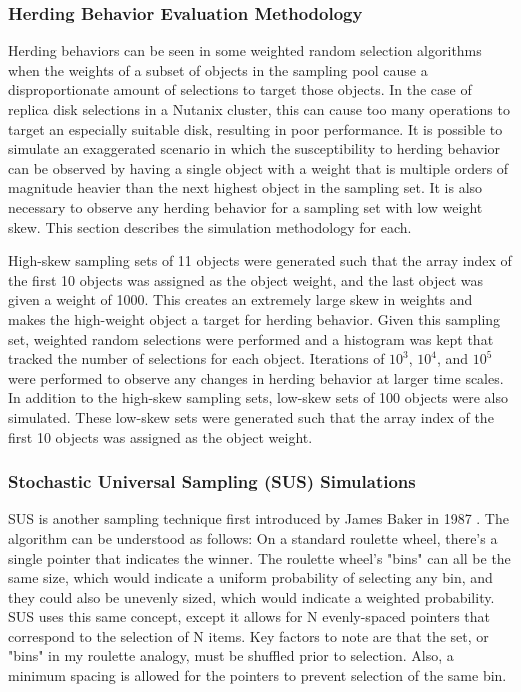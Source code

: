 \documentclass[12pt]{article}
\begin{document}
    \subsubsection{Herding Behavior Evaluation Methodology}
    Herding behaviors can be seen in some weighted random selection
    algorithms when the weights of a subset of objects in the sampling pool
    cause a disproportionate amount of selections to target those objects. In
    the case of replica disk selections in a Nutanix cluster, this can cause
    too many operations to target an especially suitable disk, resulting in
    poor performance. It is possible to simulate an exaggerated scenario in
    which the susceptibility to herding behavior can be observed by having a
    single object with a weight that is multiple orders of magnitude heavier
    than the next highest object in the sampling set. It is also necessary to
    observe any herding behavior for a sampling set with low weight skew. This
    section describes the simulation methodology for each.

    High-skew sampling sets of 11 objects were generated such that the array
    index of the first 10 objects was assigned as the object weight, and the
    last object was given a weight of 1000. This creates an extremely large
    skew in weights and makes the high-weight object a target for herding
    behavior. Given this sampling set, weighted random selections were
    performed and a histogram was kept that tracked the number of selections
    for each object. Iterations of $10^3$, $10^4$, and $10^5$ were performed to
    observe any changes in herding behavior at larger time scales. In addition
    to the high-skew sampling sets, low-skew sets of 100 objects were also
    simulated.  These low-skew sets were generated such that the array
    index of the first 10 objects was assigned as the object weight.

    \subsubsection{Stochastic Universal Sampling (SUS) Simulations}
    SUS is another sampling technique first introduced by James Baker in 1987
    \cite{baker1987}. The algorithm can be understood as follows: On a
    standard roulette wheel, there's a single pointer that indicates the winner.
    The roulette wheel's "bins" can all be the same size, which would indicate a
    uniform probability of selecting any bin, and they could also be unevenly
    sized, which would indicate a weighted probability. SUS uses this same
    concept, except it allows for N evenly-spaced pointers that correspond to the
    selection of N items. Key factors to note are that the set, or "bins" in my
    roulette analogy, must be shuffled prior to selection. Also, a minimum
    spacing is allowed for the pointers to prevent selection of the same bin.
\end{document}
